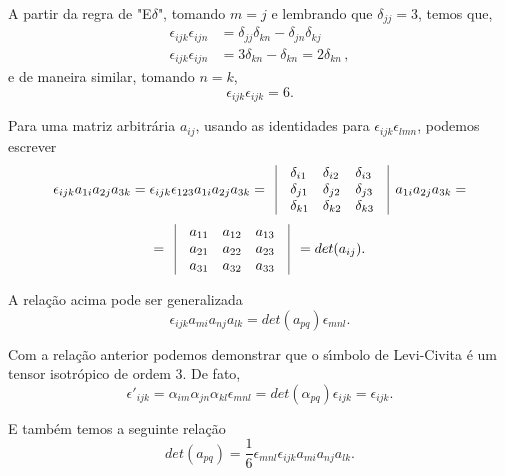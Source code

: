 A partir da regra de "E$\delta$", tomando $m=j$ e lembrando que $\delta_{jj}=3$, temos que,
\begin{align}
  \epsilon_{ijk}\epsilon_{ijn}&=\delta_{jj}\delta_{kn}-\delta_{jn}\delta_{kj}\\
  \epsilon_{ijk}\epsilon_{ijn}&=3\delta_{kn}-\delta_{kn} = 2\delta_{kn} \, ,
\end{align}
e de maneira similar, tomando $n=k$,
\begin{equation}
\epsilon_{ijk}\epsilon_{ijk}=6.
\end{equation}


Para uma matriz arbitr\'aria $a_{ij}$, usando as identidades  para
$\epsilon_{ijk}\epsilon_{lmn}$, podemos escrever
\begin{equation}
\epsilon_{ijk}a_{1i}a_{2j}a_{3k}=\epsilon_{ijk}\epsilon_{123}a_{1i}a_{2j}a_{3k}=
\begin{array}{lllll}
                \vline&\delta_{i1} & \delta_{i2} & \delta_{i3}&\vline \\
                \vline&\delta_{j1} & \delta_{j2} & \delta_{j3}&\vline \\
                \vline&\delta_{k1} & \delta_{k2} & \delta_{k3}& \vline\\
\end{array}a_{1i}a_{2j}a_{3k}=
\end{equation}
 \begin{equation}
 =\begin{array}{lllll}
                \vline&a_{11} & a_{12} & a_{13}& \vline\\
                \vline&a_{21} & a_{22} & a_{23}&\vline \\
                \vline&a_{31} & a_{32} & a_{33}&\vline \\
\end{array}=det(a_{ij}).
\end{equation}

A rela\c{c}\~ao acima pode ser generalizada
\begin{equation}
\epsilon_{ijk}a_{mi}a_{nj}a_{lk}=det(a_{pq})\epsilon_{mnl}.
\end{equation}

Com a rela\c{c}\~ao anterior podemos demonstrar que  o s\'\i mbolo
de Levi-Civita \'e um tensor isotr\'opico de ordem $3$. De fato,
\begin{equation}
\epsilon'_{ijk}=\alpha_{im}\alpha_{jn}\alpha_{kl}\epsilon_{mnl}=det(\alpha_{pq})\epsilon_{ijk}=\epsilon_{ijk}.
\end{equation}

E tamb\'em temos a seguinte rela\c{c}\~ao
\begin{equation}
det(a_{pq})=\frac{1}{6}\epsilon_{mnl}\epsilon_{ijk}a_{mi}a_{nj}a_{lk}.
\end{equation}


